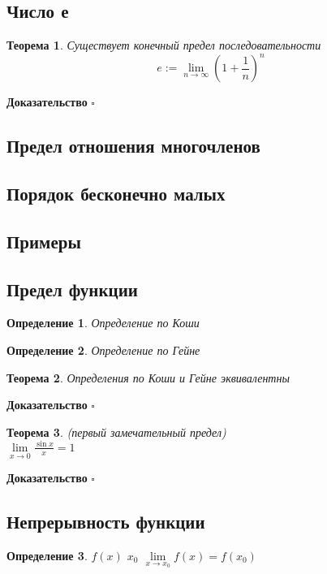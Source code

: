 \documentclass[a4paper]{article}
\newtheorem{defin}{Определение}
\newtheorem{theor}{Теорема}
\begin{document}
\subsection{Число е}
\begin{theor}
Существует конечный предел последовательности
$$e{:=}\lim\limits_{n\to\infty}\left(1+\frac{1}{n}\right)^n$$
\end{theor}
\textbf{Доказательство} $\square$
\subsection{Предел отношения многочленов}
\subsection{Порядок бесконечно малых}
\subsection{Примеры}



\subsection{Предел функции}

\begin{defin}
Определение по Коши
\end{defin}
\begin{defin}
Определение по Гейне
\end{defin}
\begin{theor}
Определения по Коши и Гейне эквивалентны
\end{theor}
\textbf{Доказательство} $\square$
\begin{theor}
(первый замечательный предел)\\
$\lim\limits_{x\to0}\frac{\sin x}{x}=1$
\end{theor}
\textbf{Доказательство} $\square$


\subsection{Непрерывность функции}
\begin{defin}
$f(x)$ $x_0$ $\lim\limits_{x\to x_0}f(x)=f(x_0)$
\end{defin}
\end{document}
